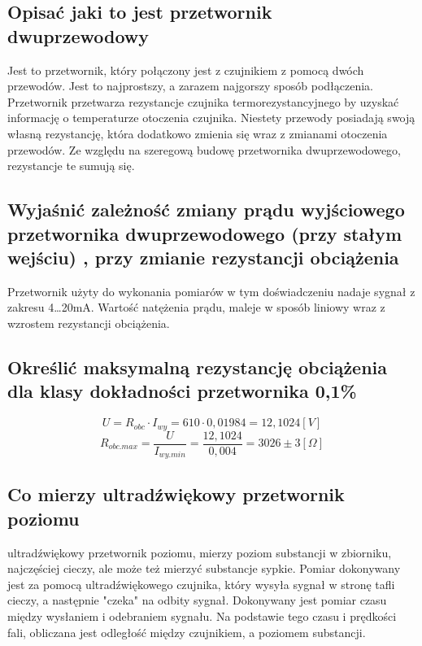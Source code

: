 \documentclass{article}
\begin{document}
\subsection{Opisać  jaki to jest przetwornik dwuprzewodowy}
Jest to przetwornik, który połączony jest z czujnikiem z pomocą dwóch przewodów. Jest to najprostszy, a zarazem najgorszy sposób podłączenia.
Przetwornik przetwarza rezystancje czujnika termorezystancyjnego by uzyskać informację o temperaturze otoczenia czujnika. Niestety przewody
posiadają swoją własną rezystancję, która dodatkowo zmienia się wraz z zmianami otoczenia przewodów. Ze względu na szeregową budowę
przetwornika dwuprzewodowego, rezystancje te sumują się. 

\subsection{Wyjaśnić zależność zmiany prądu wyjściowego przetwornika dwuprzewodowego (przy stałym wejściu) , przy zmianie rezystancji obciążenia}
Przetwornik użyty do wykonania pomiarów w tym doświadczeniu nadaje sygnał z zakresu
4…20mA. Wartość natężenia prądu, maleje w sposób liniowy wraz z wzrostem rezystancji obciążenia.

\subsection{Określić maksymalną rezystancję obciążenia  dla klasy dokładności przetwornika  0,1\%}
$$U=R_{obc}\cdot I_{wy}=610\cdot 0,01984=12,1024[V] $$
$$R_{obc.max}=\frac{U}{I_{wy.min}}=\frac{12,1024}{0,004}=3026\pm 3[\Omega]$$
\subsection{Co mierzy ultradźwiękowy przetwornik poziomu}
ultradźwiękowy przetwornik poziomu, mierzy poziom substancji w zbiorniku, najczęściej cieczy,
ale może też mierzyć substancje sypkie. Pomiar dokonywany jest za pomocą ultradźwiękowego czujnika, który
wysyła sygnał w stronę tafli cieczy, a następnie "czeka" na odbity sygnał. Dokonywany jest pomiar
czasu między wysłaniem i odebraniem sygnału. Na podstawie tego czasu i prędkości fali,
obliczana jest odległość między czujnikiem, a poziomem substancji.
\end{document}
